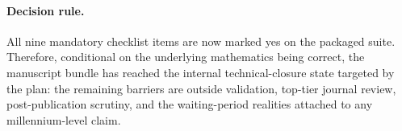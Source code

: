 \paragraph{Decision rule.}
All nine mandatory checklist items are now marked yes on the packaged suite. Therefore, conditional on the underlying mathematics being correct, the manuscript bundle has reached the internal technical-closure state targeted by the plan: the remaining barriers are outside validation, top-tier journal review, post-publication scrutiny, and the waiting-period realities attached to any millennium-level claim.
